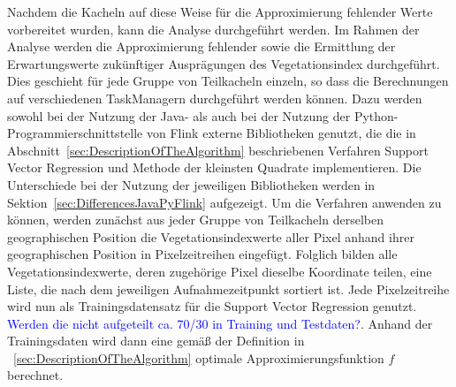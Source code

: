 Nachdem die Kacheln auf diese Weise für die Approximierung fehlender Werte vorbereitet wurden, kann die Analyse durchgeführt werden. Im Rahmen der Analyse werden die Approximierung fehlender sowie die Ermittlung der Erwartungswerte zukünftiger Ausprägungen des Vegetationsindex durchgeführt. Dies geschieht für jede Gruppe von Teilkacheln einzeln, so dass die Berechnungen auf verschiedenen TaskManagern durchgeführt werden können. Dazu werden sowohl bei der Nutzung der Java- als auch bei der Nutzung der Python-Programmierschnittstelle von Flink externe Bibliotheken genutzt, die die in Abschnitt~\ref{sec:DescriptionOfTheAlgorithm} beschriebenen Verfahren Support Vector Regression und Methode der kleinsten Quadrate implementieren. Die Unterschiede bei der Nutzung der jeweiligen Bibliotheken werden in Sektion~\ref{sec:DifferencesJavaPyFlink} aufgezeigt. Um die Verfahren anwenden zu können, werden zunächst aus jeder Gruppe von Teilkacheln derselben geographischen Position die Vegetationsindexwerte aller Pixel anhand ihrer geographischen Position in Pixelzeitreihen eingefügt. Folglich bilden alle Vegetationsindexwerte, deren zugehörige Pixel dieselbe Koordinate teilen, eine Liste, die nach dem jeweiligen Aufnahmezeitpunkt sortiert ist. Jede Pixelzeitreihe wird nun als Trainingsdatensatz für die Support Vector Regression genutzt. \textcolor{blue}{Werden die nicht aufgeteilt ca. 70/30 in Training und Testdaten?}. Anhand der Trainingsdaten wird dann eine gemäß der Definition in ~\ref{sec:DescriptionOfTheAlgorithm} optimale Approximierungsfunktion \(f \) berechnet. 

